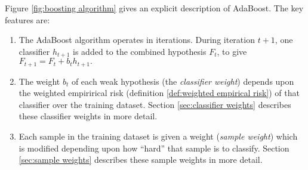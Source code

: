 Figure \ref{fig:boosting algorithm} gives an explicit description of
AdaBoost.  The key features are:
%
\begin{enumerate}
\item	The AdaBoost algorithm operates in iterations.  During
	iteration $t+1$, one classifier $h_{t+1}$ is added to the combined
	hypothesis $F_{t}$, to give $F_{t+1} = F_t + b_t h_{t+1}.$
\item	The weight $b_t$ of each weak hypothesis (the \emph{classifier
	weight}) depends upon the weighted empirirical risk
	(definition \ref{def:weighted empirical risk}) of that
	classifier over the training dataset.  Section
	\ref{sec:classifier weights} describes these classifier
	weights in more detail.
\item	Each sample in the training dataset is given a weight
	(\emph{sample weight}) which is modified depending upon how
	``hard'' that sample is to classify.  Section \ref{sec:sample
	weights} describes these sample weights in more detail.
\end{enumerate}

